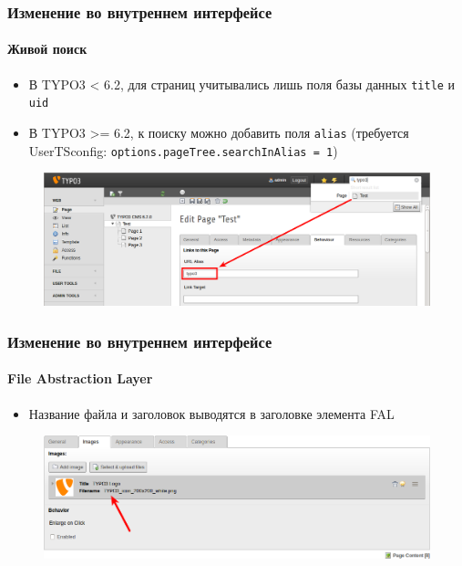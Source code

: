 
\begin{frame}[fragile]
	\frametitle{Изменение во внутреннем интерфейсе}
	\framesubtitle{Живой поиск}

	\begin{itemize}
		\item В TYPO3 < 6.2, для страниц учитывались лишь поля базы данных \texttt{title} и \texttt{uid}
		\item В TYPO3 >= 6.2, к поиску можно добавить поля \texttt{alias}\newline
			(требуется UserTSconfig: \texttt{options.pageTree.searchInAlias = 1})
	\end{itemize}

	\begin{figure}
		\includegraphics[width=0.95\linewidth]{Images/BackendChanges/LiveSearchInAlias.png}
	\end{figure}

\end{frame}


\begin{frame}[fragile]
	\frametitle{Изменение во внутреннем интерфейсе}
	\framesubtitle{File Abstraction Layer}

	\begin{itemize}
		\item Название файла и заголовок выводятся в заголовке элемента FAL
	\end{itemize}

	\begin{figure}
		\includegraphics[width=0.95\linewidth]{Images/BackendChanges/FalTitleAndFilename.png}
	\end{figure}

\end{frame}

